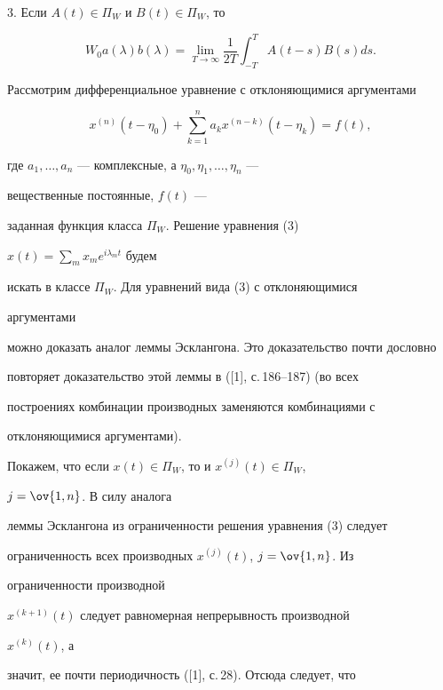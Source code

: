 3. Если $A(t)\in\Pi_W$ и $B(t)\in\Pi_W$, то 


$$ 


W_0a(\lambda)b(\lambda)=\lim_{T\to\infty}\frac{1}{2T} 


\int^T_{-T}A(t-s)B(s)d s. 


$$ 


 


Рассмотрим дифференциальное уравнение с отклоняющимися аргументами 


\begin{equation} 


x^{(n)}(t-\eta_0)+\sum^n_{k=1}a_k x^{(n-k)} 


(t-\eta_k)=f(t), 


\end{equation} 


где $a_1,\dotsc,a_n$ --- комплексные, а $\eta_0,\eta_1,\dotsc,\eta_n$ --- 


вещественные постоянные, $f(t)$ --- 


заданная функция класса $\Pi_W$. Решение уравнения (3) 


$x(t)=\sum\limits_m x_m e^{i\lambda_m t}$ будем 


искать в классе $\Pi_W$. Для уравнений вида (3) с отклоняющимися 


аргументами  


можно доказать аналог леммы Эсклангона. Это доказательство почти дословно  


повторяет доказательство этой леммы в ([1], с.\,186--187) (во всех 


построениях комбинации производных заменяются комбинациями с  


отклоняющимися аргументами). 


 


Покажем, что если $x(t)\in\Pi_W$, то и $x^{(j)}(t)\in\Pi_W$, 


$j=\ov{1,n}$. В силу аналога  


леммы Эсклангона из ограниченности решения уравнения (3) следует  


ограниченность всех производных $x^{(j)}(t)$, $j=\ov{1,n}$. Из 


ограниченности производной 


$x^{(k+1)}(t)$ следует равномерная непрерывность производной 


$x^{(k)}(t)$, а  


значит, ее почти периодичность ([1], с.\,28). Отсюда следует, что 


